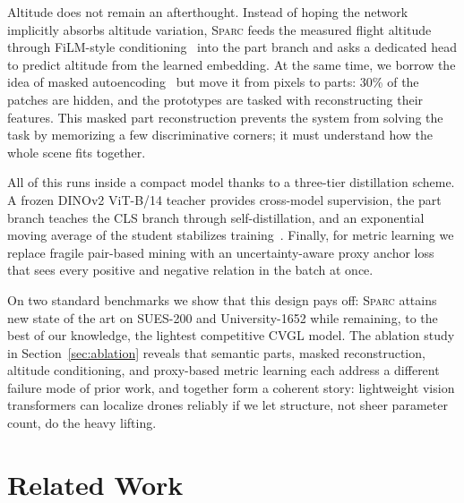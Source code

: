 \documentclass[sigconf, anonymous, review]{acmart}
\newcommand{\ours}{\textsc{Sparc}}
\begin{document}
Altitude does not remain an afterthought.
Instead of hoping the network implicitly absorbs altitude variation, \ours{} feeds the measured flight altitude through FiLM-style conditioning~\cite{perez2018film} into the part branch and asks a dedicated head to predict altitude from the learned embedding.
At the same time, we borrow the idea of masked autoencoding~\cite{he2022mae} but move it from pixels to parts: 30\% of the patches are hidden, and the prototypes are tasked with reconstructing their features.
This masked part reconstruction prevents the system from solving the task by memorizing a few discriminative corners; it must understand how the whole scene fits together.

All of this runs inside a compact model thanks to a three-tier distillation scheme.
A frozen DINOv2 ViT-B/14 teacher provides cross-model supervision, the part branch teaches the CLS branch through self-distillation, and an exponential moving average of the student stabilizes training~\cite{tarvainen2017ema}.
Finally, for metric learning we replace fragile pair-based mining with an uncertainty-aware proxy anchor loss~\cite{kim2020proxy} that sees every positive and negative relation in the batch at once.

On two standard benchmarks we show that this design pays off: \ours{} attains new state of the art on SUES-200 and University-1652 while remaining, to the best of our knowledge, the lightest competitive CVGL model.
The ablation study in Section~\ref{sec:ablation} reveals that semantic parts, masked reconstruction, altitude conditioning, and proxy-based metric learning each address a different failure mode of prior work, and together form a coherent story: lightweight vision transformers can localize drones reliably if we let structure, not sheer parameter count, do the heavy lifting.

\section{Related Work}
\label{sec:related}
\end{document}
